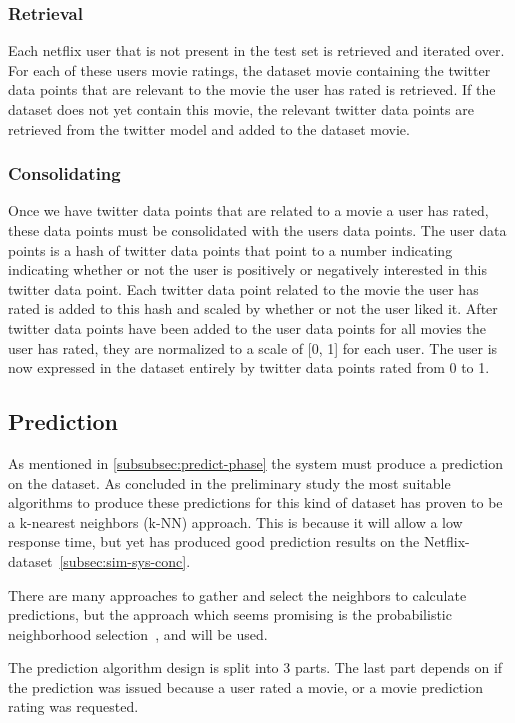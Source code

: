 \subsubsection{Retrieval}
	Each netflix user that is not present in the test set is retrieved and iterated over. For each of these users movie ratings, the dataset movie containing the twitter data points that are relevant to the movie the user has rated is retrieved. If the dataset does not yet contain this movie, the relevant twitter data points are retrieved from the twitter model and added to the dataset movie.

\subsubsection{Consolidating}
	Once we have twitter data points that are related to a movie a user has rated, these data points must be consolidated with the users data points. The user data points is a hash of twitter data points that point to a number indicating indicating whether or not the user is positively or negatively interested in this twitter data point. Each twitter data point related to the movie the user has rated is added to this hash and scaled by whether or not the user liked it. After twitter data points have been added to the user data points for all movies the user has rated, they are normalized to a scale of [0, 1] for each user. The user is now expressed in the dataset entirely by twitter data points rated from 0 to 1.

\subsection{Prediction}
As mentioned in \ref{subsubsec:predict-phase} the system must produce a prediction on the dataset. As concluded in the preliminary study the most suitable algorithms to produce these predictions for this kind of dataset has proven to be a k-nearest neighbors (k-NN) approach. This is because it will allow a low response time, but yet has produced good prediction results on the Netflix-dataset~\ref{subsec:sim-sys-conc}.

There are many approaches to gather and select the neighbors to calculate predictions, but the approach which seems promising is the probabilistic neighborhood selection~\cite{probcobfilter}, and will be used.

The prediction algorithm design is split into 3 parts. The last part depends on if the prediction was issued because a user rated a movie, or a movie prediction rating was requested.

